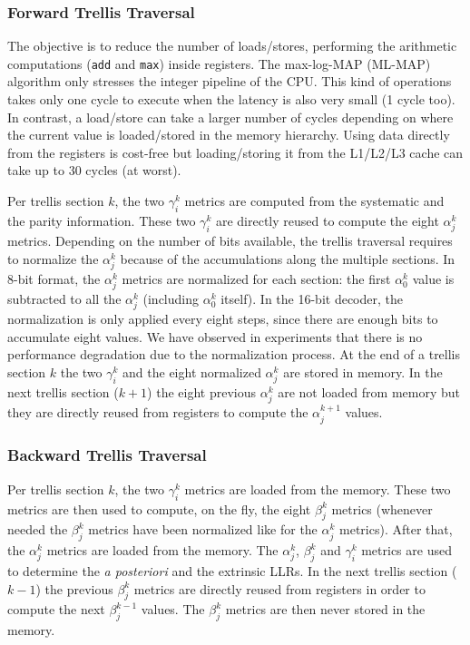 \subsubsection{Forward Trellis Traversal}

The objective is to reduce the number of loads/stores, performing the arithmetic
computations (\verb|add| and \verb|max|) inside registers. The max-log-MAP
(ML-MAP) algorithm only stresses the integer pipeline of the CPU. This kind of
operations takes only one cycle to execute when the latency is also very small
(1 cycle too). In contrast, a load/store can take a larger number of cycles
depending on where the current value is loaded/stored in the memory hierarchy.
Using data directly from the registers is cost-free but loading/storing it from
the L1/L2/L3 cache can take up to 30 cycles (at worst).

Per trellis section $k$, the two $\gamma_i^k$ metrics are computed from the
systematic and the parity information. These two $\gamma_i^k$ are directly
reused to compute the eight $\alpha_j^k$ metrics. Depending on the number of
bits available, the trellis traversal requires to normalize the $\alpha_j^k$
because of the accumulations along the multiple sections.  In 8-bit format, the
$\alpha_j^k$ metrics are normalized for each section: the first $\alpha_0^k$
value is subtracted to all the $\alpha_j^k$ (including $\alpha_0^k$ itself). In
the 16-bit decoder, the normalization is only applied every eight steps, since
there are enough bits to accumulate eight values. We have observed in
experiments that there is no performance degradation due to the normalization
process. At the end of a trellis section $k$ the two $\gamma_i^k$ and the eight
normalized $\alpha_j^k$ are stored in  memory. In the next trellis section
($k+1$) the eight previous $\alpha_j^k$ are not loaded from memory but they are
directly reused from registers to compute the $\alpha_j^{k+1}$ values.

\subsubsection{Backward Trellis Traversal}

Per trellis section $k$, the two $\gamma_i^k$ metrics are loaded from the
memory. These two metrics are then used to compute, on the fly, the eight
$\beta_j^k$ metrics (whenever needed the $\beta_j^k$ metrics have been
normalized like for the $\alpha_j^k$ metrics). After that, the $\alpha_j^k$
metrics are loaded from the memory. The $\alpha_j^k$, $\beta_j^k$ and
$\gamma_i^k$ metrics are used to determine the \textit{a posteriori} and the
extrinsic LLRs. In the next trellis section ($k-1$) the previous $\beta_j^k$
metrics are directly reused from registers in order to compute the next
$\beta_j^{k-1}$ values. The $\beta_j^k$ metrics are then never stored in the
memory.

